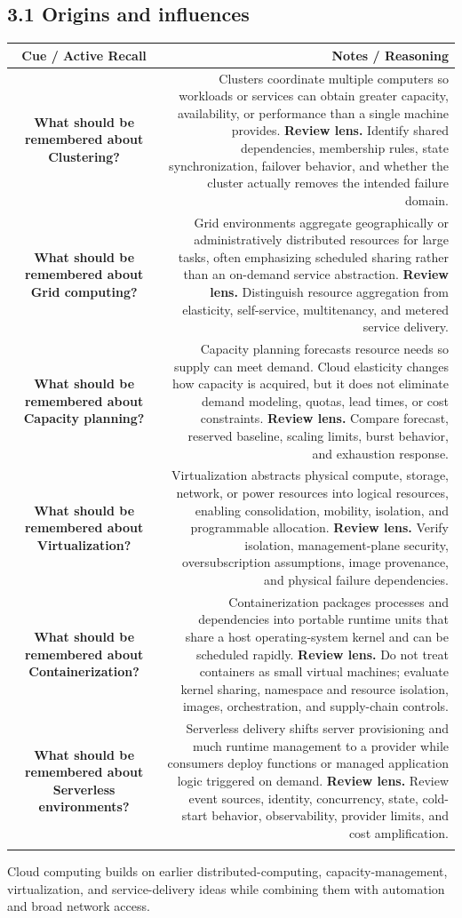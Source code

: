 \documentclass[11pt]{article}
\newcommand{\CornellHeader}{\rowcolor{Navy}\color{white}\bfseries Cue / Active Recall & \color{white}\bfseries Notes / Reasoning \\\endhead}
\newcommand{\CornellRow}[2]{\cellcolor{CueGray}\textbf{#1} & #2 \\\addlinespace[3pt]}
\begin{document}
\subsection{3.1 Origins and influences}
\begin{longtable}{@{}C N@{}}
\CornellHeader
\CornellRow{What should be remembered about Clustering?}{Clusters coordinate multiple computers so workloads or services can obtain greater capacity, availability, or performance than a single machine provides. \textbf{Review lens.} Identify shared dependencies, membership rules, state synchronization, failover behavior, and whether the cluster actually removes the intended failure domain.}
\CornellRow{What should be remembered about Grid computing?}{Grid environments aggregate geographically or administratively distributed resources for large tasks, often emphasizing scheduled sharing rather than an on-demand service abstraction. \textbf{Review lens.} Distinguish resource aggregation from elasticity, self-service, multitenancy, and metered service delivery.}
\CornellRow{What should be remembered about Capacity planning?}{Capacity planning forecasts resource needs so supply can meet demand. Cloud elasticity changes how capacity is acquired, but it does not eliminate demand modeling, quotas, lead times, or cost constraints. \textbf{Review lens.} Compare forecast, reserved baseline, scaling limits, burst behavior, and exhaustion response.}
\CornellRow{What should be remembered about Virtualization?}{Virtualization abstracts physical compute, storage, network, or power resources into logical resources, enabling consolidation, mobility, isolation, and programmable allocation. \textbf{Review lens.} Verify isolation, management-plane security, oversubscription assumptions, image provenance, and physical failure dependencies.}
\CornellRow{What should be remembered about Containerization?}{Containerization packages processes and dependencies into portable runtime units that share a host operating-system kernel and can be scheduled rapidly. \textbf{Review lens.} Do not treat containers as small virtual machines; evaluate kernel sharing, namespace and resource isolation, images, orchestration, and supply-chain controls.}
\CornellRow{What should be remembered about Serverless environments?}{Serverless delivery shifts server provisioning and much runtime management to a provider while consumers deploy functions or managed application logic triggered on demand. \textbf{Review lens.} Review event sources, identity, concurrency, state, cold-start behavior, observability, provider limits, and cost amplification.}
\end{longtable}
\begin{sectionsummarybox}
Cloud computing builds on earlier distributed-computing, capacity-management, virtualization, and service-delivery ideas while combining them with automation and broad network access.
\end{sectionsummarybox}
\end{document}
